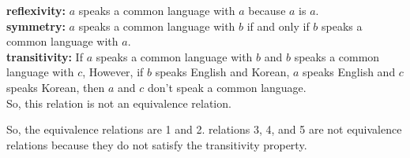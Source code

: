 \begin{enumerate}
    \textbf{reflexivity: } $a$ speaks a common language with $a$ because $a$ is $a$.\\
    \textbf{symmetry: } $a$ speaks a common language with $b$ if and only if $b$ speaks a common language with $a$.\\
    \textbf{transitivity: } If $a$ speaks a common language with $b$ and $b$ speaks a common language with $c$, However, if $b$ speaks English and Korean, $a$ speaks English and $c$ speaks Korean, then $a$ and $c$ don't speak a common language.\\
    So, this relation is not an equivalence relation.
\end{enumerate}
\noindent
So, the equivalence relations are 1 and 2. relations 3, 4, and 5 are not equivalence relations because they do not satisfy the transitivity property.